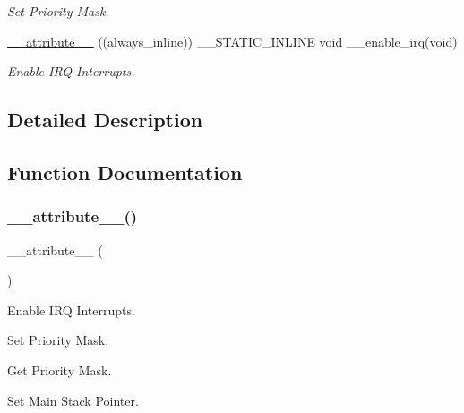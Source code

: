 \begin{DoxyCompactItemize}
\begin{DoxyCompactList}\small\item\em Set Priority Mask. \end{DoxyCompactList}\item 
\hyperlink{group___c_m_s_i_s___core___reg_acc_functions_ga671b4fa3b3ab3dbc685a5473f3fc76aa}{\+\_\+\+\_\+attribute\+\_\+\+\_\+} ((always\+\_\+inline)) \+\_\+\+\_\+\+S\+T\+A\+T\+I\+C\+\_\+\+I\+N\+L\+I\+NE void \+\_\+\+\_\+enable\+\_\+irq(void)
\begin{DoxyCompactList}\small\item\em Enable I\+RQ Interrupts. \end{DoxyCompactList}\end{DoxyCompactItemize}


\subsection{Detailed Description}


\subsection{Function Documentation}
\mbox{\label{group___c_m_s_i_s___core___reg_acc_functions_ga671b4fa3b3ab3dbc685a5473f3fc76aa}} 
\subsubsection{\texorpdfstring{\+\_\+\+\_\+attribute\+\_\+\+\_\+()}{\_\_attribute\_\_()}}
{\footnotesize\ttfamily \+\_\+\+\_\+attribute\+\_\+\+\_\+ (\begin{DoxyParamCaption}\item[{(always\+\_\+inline)}]{ }\end{DoxyParamCaption})}



Enable I\+RQ Interrupts. 

Set Priority Mask.

Get Priority Mask.

Set Main Stack Pointer.

